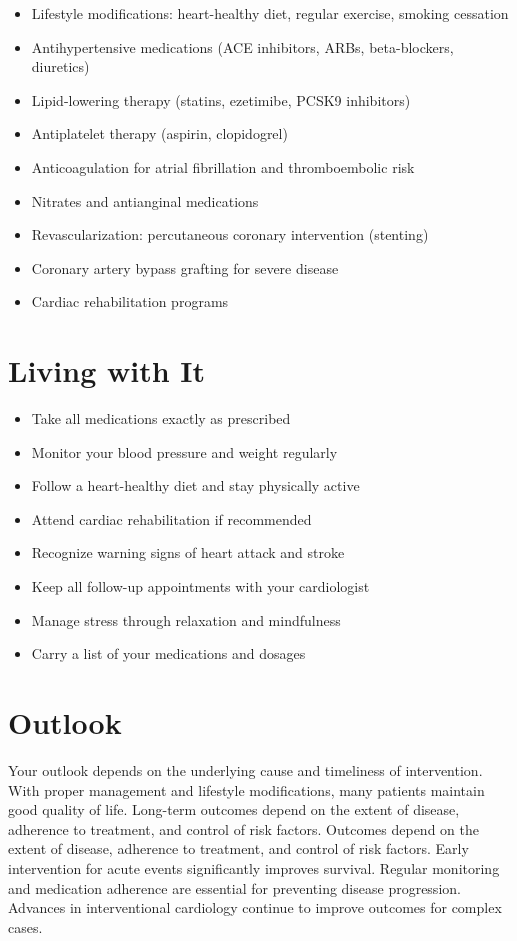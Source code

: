 \begin{itemize}[noitemsep]
  \item Lifestyle modifications: heart-healthy diet, regular exercise, smoking cessation
  \item Antihypertensive medications (ACE inhibitors, ARBs, beta-blockers, diuretics)
  \item Lipid-lowering therapy (statins, ezetimibe, PCSK9 inhibitors)
  \item Antiplatelet therapy (aspirin, clopidogrel)
  \item Anticoagulation for atrial fibrillation and thromboembolic risk
  \item Nitrates and antianginal medications
  \item Revascularization: percutaneous coronary intervention (stenting)
  \item Coronary artery bypass grafting for severe disease
  \item Cardiac rehabilitation programs
\end{itemize}
\section{Living with It}
\begin{itemize}[noitemsep]
  \item Take all medications exactly as prescribed
  \item Monitor your blood pressure and weight regularly
  \item Follow a heart-healthy diet and stay physically active
  \item Attend cardiac rehabilitation if recommended
  \item Recognize warning signs of heart attack and stroke
  \item Keep all follow-up appointments with your cardiologist
  \item Manage stress through relaxation and mindfulness
  \item Carry a list of your medications and dosages
\end{itemize}
\section{Outlook}
Your outlook depends on the underlying cause and timeliness of intervention. With proper management and lifestyle modifications, many patients maintain good quality of life. Long-term outcomes depend on the extent of disease, adherence to treatment, and control of risk factors. Outcomes depend on the extent of disease, adherence to treatment, and control of risk factors. Early intervention for acute events significantly improves survival. Regular monitoring and medication adherence are essential for preventing disease progression. Advances in interventional cardiology continue to improve outcomes for complex cases.
